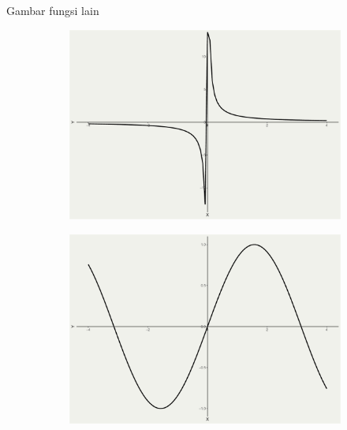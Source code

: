 \documentclass[
  ignorenonframetext,
]{beamer}
\begin{document}
\begin{frame}{Gambar fungsi lain}
\begin{figure}
\begin{minipage}{0.33\linewidth}
\begin{figure}[H]
{}


\end{figure}%

\end{minipage}%
%
\begin{minipage}{0.33\linewidth}

\begin{figure}[H]

{\centering \includegraphics{index_files/figure-beamer/unnamed-chunk-5-5.pdf}

}


\end{figure}%

\end{minipage}%
%
\begin{minipage}{0.33\linewidth}

\begin{figure}[H]

{\centering \includegraphics{index_files/figure-beamer/unnamed-chunk-5-6.pdf}

}
\end{figure}
\end{minipage}
\end{figure}
\end{frame}
\end{document}
